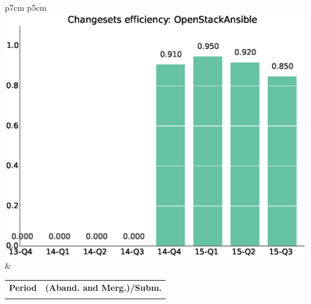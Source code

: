 \documentclass[a4wide,11pt]{article}
\begin{document}
\begin{tabular}{p{7cm} p{5cm}}
    \vspace{0pt} 
    \includegraphics[scale=.35]{figs/bmiscrOpenStackAnsible.eps}
    & 
    \vspace{0pt}
    \begin{tabular}{l|l}%
    \bfseries Period & \bfseries (Aband. and Merg.)/Subm. %
    \csvreader[head to column names]{data/submitted_reviewsOpenStackAnsible.csv}{}%
    {\\ & \bmi}
    \end{tabular}
\end{tabular}
\end{document}
